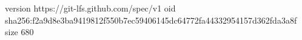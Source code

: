 version https://git-lfs.github.com/spec/v1
oid sha256:f2a9d8e3ba9419812f550b7ec59406145dc64772fa44332954157d362fda3a8f
size 680
